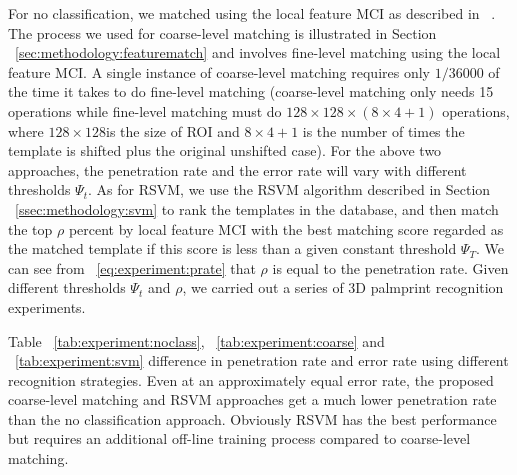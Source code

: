 For no classification, we matched using the local feature MCI as described in ~\cite{Zhang:2009dp}. The process we used for coarse-level matching is illustrated in Section ~\ref{sec:methodology:featurematch} and involves fine-level matching using the local feature MCI. A single instance of coarse-level matching requires only $1/36000$ of the time it takes to do fine-level matching (coarse-level matching only needs 15 operations while fine-level matching must do $128\times128\times(8\times4+1)$ operations, where $128\times128$is the size of ROI and $8\times4+1$ is the number of times the template is shifted plus the original unshifted case). For the above two approaches, the penetration rate and the error rate will vary with different thresholds $\Psi_t$. As for RSVM, we use the RSVM algorithm described in Section ~\ref{ssec:methodology:svm} to rank the templates in the database, and then match the top $\rho$ percent by local feature MCI with the best matching score regarded as the matched template if this score is less than a given constant threshold $\Psi_T$. We can see from ~\ref{eq:experiment:prate} that $\rho$ is equal to the penetration rate. Given different thresholds $\Psi_t$ and $\rho$, we carried out a series of 3D palmprint recognition experiments.





Table ~\ref{tab:experiment:noclass}, ~\ref{tab:experiment:coarse} and ~\ref{tab:experiment:svm} difference in penetration rate and error rate using different recognition strategies. Even at an approximately equal error rate, the proposed coarse-level matching and RSVM approaches get a much lower penetration rate than the no classification approach. Obviously RSVM has the best performance but requires an additional off-line training process compared to coarse-level matching.


